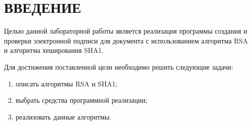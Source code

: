 \chapter*{ВВЕДЕНИЕ}

Целью данной лабораторной работы является реализация программы создания и проверки электронной подписи для документа с использованием алгоритма RSA и алгоритма хеширования SHA1.

Для достижения поставленной цели необходимо решить следующие задачи:

\begin{enumerate}[label={\arabic*)}]
	\item описать алгоритмы RSA и SHA1;
	\item выбрать средства программной реализации;
	\item реализовать данные алгоритмы.
\end{enumerate}